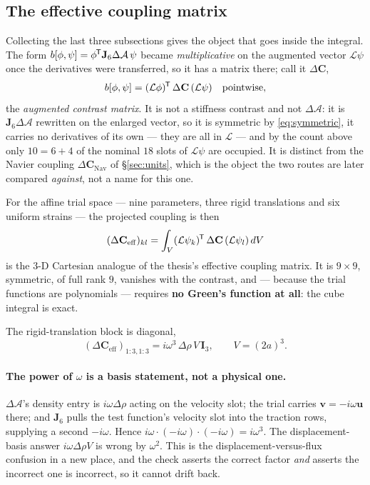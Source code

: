 \documentclass[11pt,a4paper]{article}
\newcommand{\bI}{\mathbf{I}}
\newcommand{\bv}{\mathbf{v}}
\newcommand{\bu}{\mathbf{u}}
\newcommand{\dA}{\Delta\mathcal{A}}
\newcommand{\dC}{\Delta\mathbf{C}}
\newcommand{\dCeff}{\Delta\mathbf{C}_{\mathrm{eff}}}
\newcommand{\dCnav}{\Delta\mathbf{C}_{\mathrm{Nav}}}
\newcommand{\Jsix}{\mathbf{J}_{6}}
\newcommand{\tp}{^{\mkern-1.5mu\mathsf{T}}}
\begin{document}
\subsection{The effective coupling matrix}

Collecting the last three subsections gives the object that goes inside the
integral.  The form $b[\phi,\psi] = \phi\tp\Jsix\dA\,\psi$ became
\emph{multiplicative} on the augmented vector $\mathcal{L}\psi$ once the
derivatives were transferred, so it has a matrix there; call it $\dC$,
\begin{equation}\label{eq:dCdef}
  b[\phi,\psi] = (\mathcal{L}\phi)\tp\,\dC\,(\mathcal{L}\psi)
  \quad\text{pointwise},
\end{equation}
the \emph{augmented contrast matrix}.  It is not a stiffness contrast and not
$\dA$: it is $\Jsix\dA$ rewritten on the enlarged vector, so it is symmetric by
\eqref{eq:symmetric}, it carries no derivatives of its own --- they are all in
$\mathcal{L}$ --- and by the count above only $10 = 6+4$ of the nominal $18$
slots of $\mathcal{L}\psi$ are occupied.  It is distinct from the Navier
coupling $\dCnav$ of \S\ref{sec:units}, which is the object the two routes are
later compared \emph{against}, not a name for this one.

For the affine trial space --- nine parameters, three rigid translations and six
uniform strains --- the projected coupling is then
\begin{equation}\label{eq:dCeff}
  (\dCeff)_{kl} = \int_V (\mathcal{L}\psi_k)\tp\,\dC\,(\mathcal{L}\psi_l)\,dV
\end{equation}
is the $3$-D Cartesian analogue of the thesis's effective coupling matrix.  It
is $9\times9$, symmetric, of full rank $9$, vanishes with the contrast, and
--- because the trial functions are polynomials --- requires \textbf{no Green's
function at all}: the cube integral is exact.

The rigid-translation block is diagonal,
\begin{equation}\label{eq:rigid}
  (\dCeff)_{1:3,1:3} = i\omega^{3}\,\Delta\rho\,V\,\bI_3,
  \qquad V = (2a)^3 .
\end{equation}

\paragraph{The power of $\omega$ is a basis statement, not a physical one.}
$\dA$'s density entry is $i\omega\Delta\rho$ acting on the velocity slot; the
trial carries $\bv = -i\omega\bu$ there; and $\Jsix$ pulls the test function's
velocity slot into the traction rows, supplying a second $-i\omega$.  Hence
$i\omega\cdot(-i\omega)\cdot(-i\omega) = i\omega^{3}$.  The displacement-basis
answer $i\omega\Delta\rho V$ is wrong by $\omega^2$.  This is the
displacement-versus-flux confusion in a new place, and the check asserts the
correct factor \emph{and} asserts the incorrect one is incorrect, so it cannot
drift back.
\end{document}
